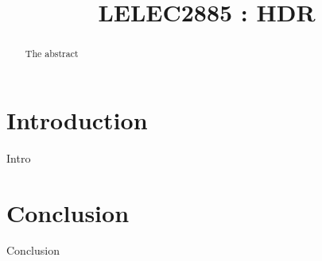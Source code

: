 \documentclass[conference]{IEEEtran}
\begin{document}
\title{LELEC2885 : HDR}


\author{
\and
{}
\and
{}
\and
{}
}

\maketitle

\begin{abstract}
The abstract
\end{abstract}

\section{Introduction}
Intro
\cite{ma2015perceptual} \cite{zhang2012gradient} \cite{khan2006ghost}

\section{Conclusion}
Conclusion
\newpage



\end{document}
